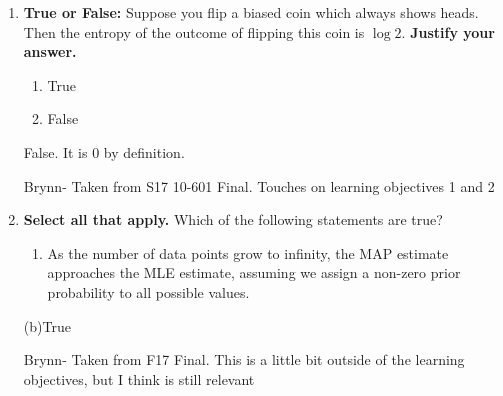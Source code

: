 \begin{enumerate}
    
    \item  {} \textbf{True or False:} Suppose you flip a biased coin which always shows heads. 
    Then the entropy of the outcome of flipping this coin is $\log 2$.
    \textbf{Justify your answer.}
    \begin{enumerate}
    \item True
    \item False
    \end{enumerate}
    \fillwithlines{4em}
    
    \begin{soln} False. It is $0$ by definition.
    \end{soln}
    
    \begin{qauthor}
    Brynn- Taken from S17 10-601 Final. Touches on learning objectives 1 and 2
    \end{qauthor}
    
    
    \item{} \textbf{Select all that apply.} Which of the following statements are true?
    \begin{enumerate}
        \item As the number of data points grow to infinity, the MAP estimate approaches the MLE estimate, assuming we assign a non-zero prior probability to all possible values.

    
    \end{enumerate}
    \begin{soln}
    (b)True
    \end{soln} 
    
    \begin{qauthor}
    Brynn- Taken from F17 Final.  This is a little bit outside of the learning objectives, but I think is still relevant
    \end{qauthor}
    

\end{enumerate}

